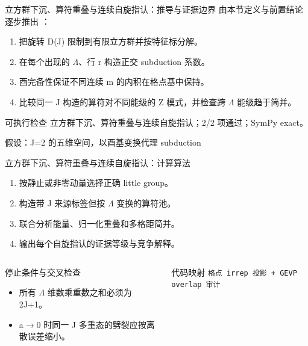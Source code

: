 \begin{frame}[t]{立方群下沉、算符重叠与连续自旋指认：推导与证据边界}
\footnotesize
{}\quad 由本节定义与前置结论逐步推出 ：
\begin{enumerate}
\item 把旋转 D(J) 限制到有限立方群并按特征标分解。
\item 在每个出现的 \ensuremath{\Lambda}、行 r 构造正交 subduction 系数。
\item 酉完备性保证不同连续 m 的内积在格点基中保持。
\item 比较同一 J 构造的算符对不同能级的 Z 模式，并检查跨 \ensuremath{\Lambda} 能级趋于简并。
\end{enumerate}\begin{block}{可执行检查}
\quad 立方群下沉、算符重叠与连续自旋指认；2/2 项通过；SymPy exact。
\par\scriptsize 假设：J=2 的五维空间，以酉基变换代理 subduction
\end{block}
\end{frame}

\begin{frame}[t]{立方群下沉、算符重叠与连续自旋指认：计算算法}
\footnotesize
{}\begin{enumerate}
\item 按静止或非零动量选择正确 little group。
\item 构造带 J 来源标签但按 \ensuremath{\Lambda} 变换的算符池。
\item 联合分析能量、归一化重叠和多格距简并。
\item 输出每个自旋指认的证据等级与竞争解释。
\end{enumerate}\begin{columns}[T,onlytextwidth]
\begin{block}{停止条件与交叉检查}\scriptsize\begin{itemize}
\item[\CheckMark] 所有 \ensuremath{\Lambda} 维数乘重数之和必须为 2J+1。
\item[\CheckMark] a\ensuremath{\rightarrow}0 时同一 J 多重态的劈裂应按离散误差缩小。
\end{itemize}\end{block}
\begin{block}{代码映射}
\scriptsize \texttt{格点 irrep 投影 + GEVP overlap 审计}
\end{block}\end{columns}\end{frame}

